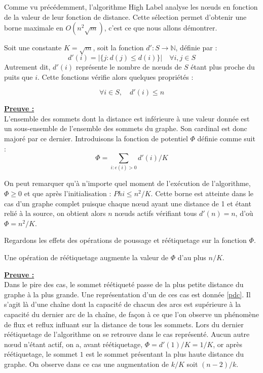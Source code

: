 Comme vu précédemment, l'algorithme High Label analyse les n\oe uds en fonction de la valeur de leur
fonction de distance. Cette sélection permet d'obtenir une borne maximale en $O(n^2\sqrt{m})$, c'est
ce que nous allons démontrer.

Soit une constante $K = \sqrt{m}$, soit la fonction $d': S \longrightarrow \mathbb{N}$, définie par
: $$
d'(i) = |\{j : d(j) \leq d(i) \}| \quad \forall i,j \in S $$
Autrement dit, $d'(i)$ représente le nombre de n\oe uds de $S$ étant plus proche du puits que $i$.
Cette fonctions vérifie alors quelques propriétés : 
\begin{lemma}
	$$\forall i \in S, \quad d'(i) \leq n$$
\end{lemma}

\underline{\textbf{Preuve :}}\\
L'ensemble des sommets dont la distance est inférieure à une valeur donnée est un sous-ensemble de
l'ensemble des sommets du graphe. Son cardinal est donc majoré par ce dernier.
Introduisons la fonction de potentiel $\Phi$ définie comme suit : $$
\Phi = \sum_{i : e(i) > 0} d'(i) / K $$

On peut remarquer qu'à n'importe quel moment de l'exécution de l'algorithme, $\Phi \geq 0$ et que
après l'initialisation : $Phi \leq n^2 / K$. Cette borne est atteinte dans le cas d'un graphe
complet puisque chaque n\oe ud ayant une distance de 1 et étant relié à la source, on obtient alors
$n$ n\oe uds actifs vérifiant tous $d'(n) = n$, d'où $\Phi = n^2/K$.

Regardons les effets des opérations de poussage et réétiquetage sur la fonction $\Phi$.

\begin{lemma}
	Une opération de réétiquetage augmente la valeur de $\Phi$ d'au plus $n/K$.
\end{lemma}

\underline{\textbf{Preuve :}}\\Dans le pire des cas, le sommet réétiqueté passe de la plus petite
distance du graphe à la plus grande. Une représentation d'un de ces cas est donnée \ref{pdc}. Il
s'agit là d'une chaîne dont la capacité de chacun des arcs est supérieure à la capacité du dernier
arc de la chaîne, de façon à ce que l'on observe un phénomène de flux et reflux influant sur la
distance de tous les sommets. Lors du dernier réétiquetage de l'algorithme on se retrouve dans le
cas représenté.
Aucun autre n\oe ud n'étant actif, on a, avant réétiquetage, $\Phi = d'(1) / K = 1/K$, or après
réétiquetage, le sommet $1$ est le sommet présentant la plus haute distance du graphe. On observe
dans ce cas une augmentation de $k/K$ soit $(n-2)/k$.


